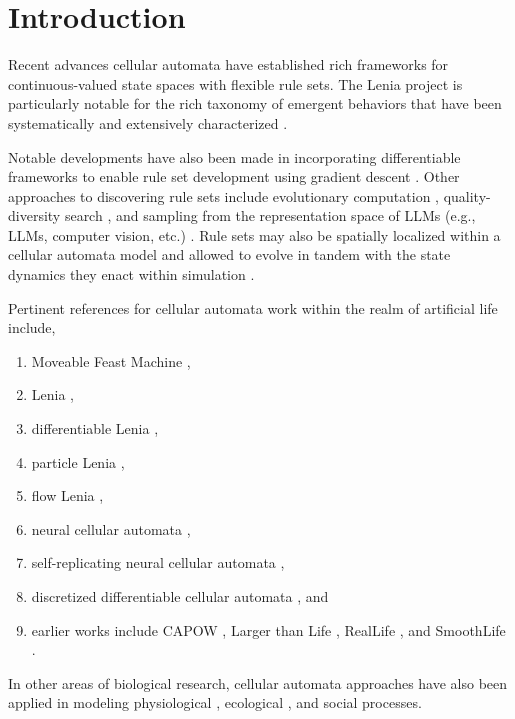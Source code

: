 \section{Introduction} \label{sec:introduction}

Recent advances cellular automata have established rich frameworks for continuous-valued state spaces with flexible rule sets.
The Lenia project is particularly notable for the rich taxonomy of emergent behaviors that have been systematically and extensively characterized \citep{chan2020lenia,horibe2023exploring}.

Notable developments have also been made in incorporating differentiable frameworks to enable rule set development using gradient descent \citep{mordvintsev2020growing,hamon2022learning}.
Other approaches to discovering rule sets include evolutionary computation \citep{jain2024capturing}, quality-diversity search \citep{faldor2024toward}, and sampling from the representation space of LLMs (e.g., LLMs, computer vision, etc.) \citep{kumar2024automating}.
Rule sets may also be spatially localized within a cellular automata model and allowed to evolve in tandem with the state dynamics they enact within simulation \citep{plantec2023flowlenia}.

Pertinent references for cellular automata work within the realm of artificial life include,
\begin{enumerate}
\item Moveable Feast Machine \citep{ackley2023robust,ackley2019building,ackley2012movable},
\item Lenia \citep{chan2020lenia,chan2019lenia},
\item differentiable Lenia \citep{hamon2022learning},
\item particle Lenia \citep{mordvintsev2022particle},
\item flow Lenia \citep{plantec2023flowlenia},
\item neural cellular automata \citep{mordvintsev2020growing},
\item self-replicating neural cellular automata \citep{sinapayen2023selfreplication},
\item discretized differentiable cellular automata \citep{miotti2025differentiable}, and
\item earlier works include CAPOW \citep{griffeath2003new}, Larger than Life \citep{evans2001larger}, RealLife \citep{pivato2007reallife}, and SmoothLife \citep{rafler2011generalization}.
\end{enumerate}
In other areas of biological research, cellular automata approaches have also been applied in modeling physiological \citep{peak2004evidence,davidenko1992stationary}, ecological \citep{breckling2011cellular}, and social \citep{beltran2009forecasting} processes.

